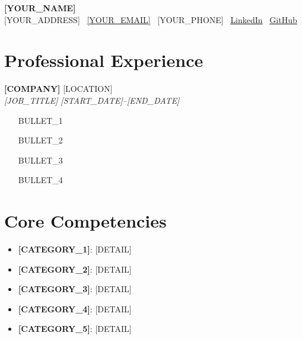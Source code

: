 \documentclass[10.5pt,a4paper]{article}
\newcommand{\cvheaderline}[2]{\textbf{#1} \hfill #2\\}
\newcommand{\cvsubheaderline}[2]{\textit{#1} \hfill \textit{#2}\\[1pt]}
\newcommand{\cvlink}[2]{\href{#1}{\underline{#2}}}
\begin{document}
\begin{center}
{\LARGE \bfseries [YOUR_NAME]}\\[3pt]
[YOUR_ADDRESS] \textbullet\ \cvlink{mailto:[YOUR_EMAIL]}{[YOUR_EMAIL]} \textbullet\ [YOUR_PHONE] \textbullet\ \cvlink{[YOUR_LINKEDIN_URL]}{LinkedIn} \textbullet\ \cvlink{[YOUR_GITHUB_URL]}{GitHub}
\end{center}
\vspace{2pt}
{\titlerule[0.6pt]}
\vspace{5pt}


\vspace{2pt}

\section{Professional Experience}

\cvheaderline{[COMPANY]}{[LOCATION]}
\cvsubheaderline{[JOB_TITLE]}{[START_DATE]--[END_DATE]}
\begin{itemize}
\item [BULLET_1]
\item [BULLET_2]
\item [BULLET_3]
\item [BULLET_4]
\end{itemize}


\section{Core Competencies}
\begin{itemize}
\item \textbf{[CATEGORY_1]}: [DETAIL]
\item \textbf{[CATEGORY_2]}: [DETAIL]
\item \textbf{[CATEGORY_3]}: [DETAIL]
\item \textbf{[CATEGORY_4]}: [DETAIL]
\item \textbf{[CATEGORY_5]}: [DETAIL]
\end{itemize}
\end{document}
